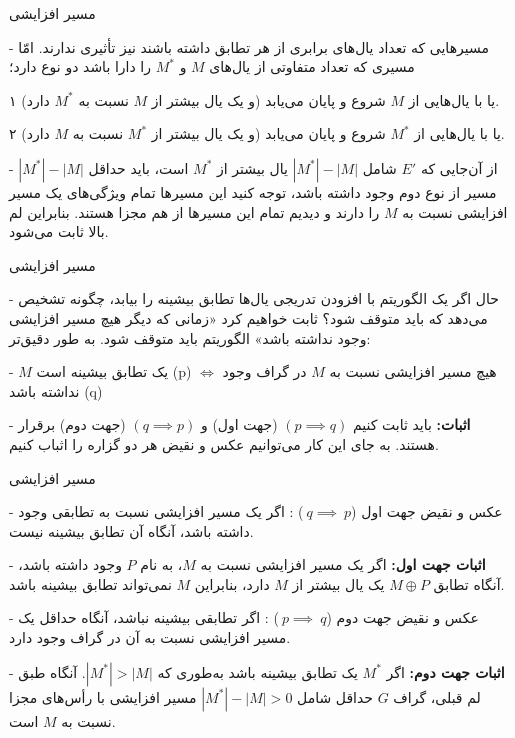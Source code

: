 \begin{itemframe}{مسیر افزایشی}
\item[-]
مسیرهایی که تعداد یال‌های برابری از هر تطابق داشته باشند نیز تأثیری ندارند. امّا مسیری که تعداد متفاوتی از یال‌های $M$ و $M^*$ را دارا باشد دو نوع دارد؛
\item[۱]
یا با یال‌هایی از $M$ شروع و پایان می‌یابد (و یک یال بیشتر از $M$ نسبت به $M^*$ دارد).
\item[۲]
یا با یال‌هایی از $M^*$ شروع و پایان می‌یابد (و یک یال بیشتر از $M^*$ نسبت به $M$ دارد).
\item[-]
از آن‌جایی که $E'$ شامل $|M^*| - |M|$ یال بیشتر از $M^*$ است، باید حداقل $|M^*| - |M|$ مسیر از نوع دوم وجود داشته باشد، توجه کنید این مسیرها تمام ویژگی‌های یک مسیر افزایشی نسبت به $M$ را دارند و دیدیم تمام این مسیرها از هم مجزا هستند. بنابراین لم بالا ثابت می‌شود.
\end{itemframe}



\begin{itemframe}{مسیر افزایشی}
\item[-]
حال اگر یک الگوریتم با افزودن تدریجی یال‌ها تطابق بیشینه را بیابد، چگونه تشخیص می‌دهد که باید متوقف شود؟ ثابت خواهیم کرد «زمانی که دیگر هیچ مسیر افزایشی وجود نداشته باشد» الگوریتم باید متوقف شود. به طور دقیق‌تر:
\item[-]
$M$ یک تطابق بیشینه است (p)
$\iff$
 هیچ مسیر افزایشی نسبت به $M$ در گراف وجود نداشته باشد (q)

\item[-]
\textbf{اثبات:}
باید ثابت کنیم
$(p \implies q) $
 (جهت اول) و
$ (q \implies p)$
 (جهت دوم) برقرار هستند. به جای این کار می‌توانیم عکس و نقیض
 هر دو گزاره را اثباب کنیم.

\end{itemframe}


\begin{itemframe}{مسیر افزایشی}
\item[-]
عکس و نقیض جهت اول
($~q\implies~p$)
: اگر یک مسیر افزایشی نسبت به تطابقی وجود داشته باشد، آنگاه آن تطابق بیشینه نیست.
\item[-]
\textbf{اثبات جهت اول:}
اگر یک مسیر افزایشی نسبت به $M$، به نام $P$ وجود داشته باشد، آنگاه تطابق $M \oplus P$ یک یال بیشتر از $M$ دارد، بنابراین $M$ نمی‌تواند تطابق بیشینه باشد.

\item[-]
عکس و نقیض جهت دوم
($‍~p \implies ~q$)
: اگر تطابقی بیشینه نباشد، آنگاه حداقل یک مسیر افزایشی نسبت به آن در گراف وجود دارد.
\item[-]
\textbf{اثبات جهت دوم:}
اگر $M^*$ یک تطابق بیشینه باشد به‌طوری که $|M^*| > |M|$. آنگاه طبق لم قبلی، گراف $G$ حداقل شامل
$|M^*| - |M| > 0$
 مسیر افزایشی با رأس‌های مجزا نسبت به $M$ است.
\end{itemframe}


